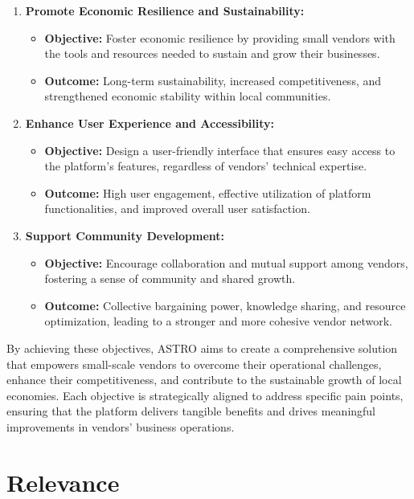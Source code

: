\begin{enumerate}
    \item \textbf{Promote Economic Resilience and Sustainability:}
    \begin{itemize}
        \item \textbf{Objective:} Foster economic resilience by providing small vendors with the tools and resources needed to sustain and grow their businesses.
        \item \textbf{Outcome:} Long-term sustainability, increased competitiveness, and strengthened economic stability within local communities.
    \end{itemize}
    
    \item \textbf{Enhance User Experience and Accessibility:}
    \begin{itemize}
        \item \textbf{Objective:} Design a user-friendly interface that ensures easy access to the platform’s features, regardless of vendors’ technical expertise.
        \item \textbf{Outcome:} High user engagement, effective utilization of platform functionalities, and improved overall user satisfaction.
    \end{itemize}
    
    \item \textbf{Support Community Development:}
    \begin{itemize}
        \item \textbf{Objective:} Encourage collaboration and mutual support among vendors, fostering a sense of community and shared growth.
        \item \textbf{Outcome:} Collective bargaining power, knowledge sharing, and resource optimization, leading to a stronger and more cohesive vendor network.
    \end{itemize}
\end{enumerate}

By achieving these objectives, ASTRO aims to create a comprehensive solution that empowers small-scale vendors to overcome their operational challenges, enhance their competitiveness, and contribute to the sustainable growth of local economies. Each objective is strategically aligned to address specific pain points, ensuring that the platform delivers tangible benefits and drives meaningful improvements in vendors' business operations.
	
	
	
	
	\section{Relevance}
	
